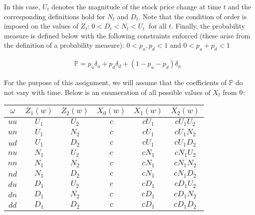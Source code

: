 \documentclass{article}
\begin{document}
In this case, $U_t$ denotes the magnitude of the stock price change at time $t$ and the corresponding definitions hold for $N_t$ and $D_t$. Note that the condition of order is imposed on the values of $Z_t$: $0<D_t<N_t<U_t\medspace$ for all $t$. Finally, the probability measure is defined below with the following constraints enforced (these arise from the definition of a probability measure): $0<p_u,p_d<1$ and $0<p_u+p_d<1$

\begin{align*}
    \mathbb{P} = p_u\delta_u + p_d\delta_d + (1-p_u-p_d)\delta_n
\end{align*}

For the purpose of this assignment, we will assume that the coefficients of $\mathbb{P}$ do not vary with time. Below is an enumeration of all possible values of $X_t$ from $0\let\le2$:

\begin{center}
\begin{tabular}{|c|c|c|c|c|c|}
\hline 
$\omega$ & $Z_1(w)$ & $Z_2(w)$ & $X_0(w)$ & $X_1(w)$ & $X_2(w)$ \\
\hline 
\hline 
$uu$ & $U_1$ & $U_2$ & $c$ & $cU_1$ & $cU_1U_2$ \\\hline
$un$ & $U_1$ & $N_2$ & $c$ & $cU_1$ & $cU_1N_2$ \\\hline
$ud$ & $U_1$ & $D_2$ & $c$ & $cU_1$ & $cU_1D_2$ \\\hline
$nu$ & $N_1$ & $U_2$ & $c$ & $cN_1$ & $cN_1U_2$ \\\hline
$nn$ & $N_1$ & $N_2$ & $c$ & $cN_1$ & $cN_1N_2$ \\\hline
$nd$ & $N_1$ & $D_2$ & $c$ & $cN_1$ & $cN_1D_2$ \\\hline
$du$ & $D_1$ & $U_2$ & $c$ & $cD_1$ & $cD_1U_2$ \\\hline
$dn$ & $D_1$ & $N_2$ & $c$ & $cD_1$ & $cD_1N_2$ \\\hline
$dd$ & $D_1$ & $D_2$ & $c$ & $cD_1$ & $cD_1D_2$ \\\hline
\end{tabular}
\end{center}
\end{document}
